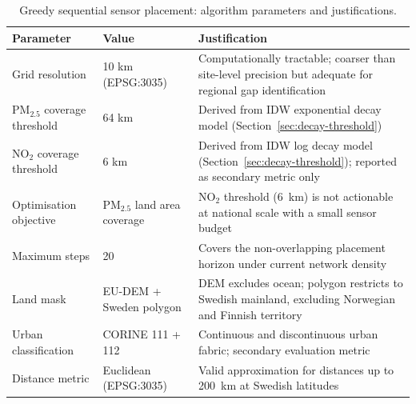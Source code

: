 \documentclass[11pt,a4paper]{article}
\begin{document}
\begin{table}[ht]
\caption{Greedy sequential sensor placement: algorithm parameters and justifications.}
\label{tab:placement-params}
\centering
\small
\begin{tabular}{p{4cm}p{3.5cm}p{6cm}}
\hline
\textbf{Parameter} & \textbf{Value} & \textbf{Justification} \\
\hline
Grid resolution & 10 km (EPSG:3035) & Computationally tractable; coarser than site-level precision but adequate for regional gap identification \\
PM$_{2.5}$ coverage threshold & 64 km & Derived from IDW exponential decay model (Section~\ref{sec:decay-threshold}) \\
NO$_2$ coverage threshold & 6 km & Derived from IDW log decay model (Section~\ref{sec:decay-threshold}); reported as secondary metric only \\
Optimisation objective & PM$_{2.5}$ land area coverage & NO$_2$ threshold (6~km) is not actionable at national scale with a small sensor budget \\
Maximum steps & 20 & Covers the non-overlapping placement horizon under current network density \\
Land mask & EU-DEM + Sweden polygon & DEM excludes ocean; polygon restricts to Swedish mainland, excluding Norwegian and Finnish territory \\
Urban classification & CORINE 111 + 112 & Continuous and discontinuous urban fabric; secondary evaluation metric \\
Distance metric & Euclidean (EPSG:3035) & Valid approximation for distances up to 200~km at Swedish latitudes \\
\hline
\end{tabular}
\end{table}
\end{document}
